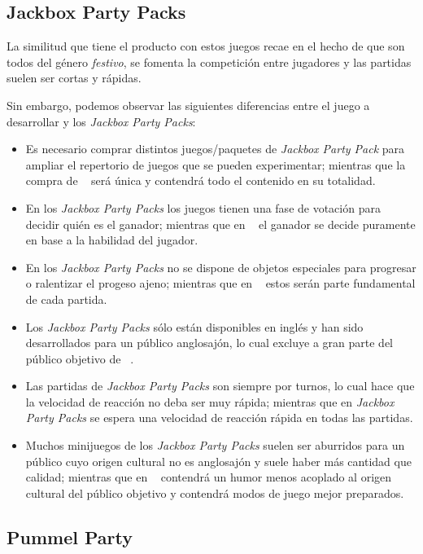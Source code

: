 \subsection{Jackbox Party Packs}

La similitud que tiene el producto con estos juegos recae en el hecho de que son
todos del género \emph{festivo}, se fomenta la competición entre jugadores y las
partidas suelen ser cortas y rápidas.

Sin embargo, podemos observar las siguientes diferencias entre el juego a
desarrollar y los \emph{Jackbox Party Packs}:
\begin{itemize}
    \item Es necesario comprar distintos juegos/paquetes de \emph{Jackbox Party
    Pack} para ampliar el repertorio de juegos que se pueden experimentar;
    mientras que la compra de \emph{\izenburua\ } será única y contendrá todo el
    contenido en su totalidad.
    \item En los \emph{Jackbox Party Packs} los juegos tienen una fase de
    votación para decidir quién es el ganador; mientras que en \emph{\izenburua\
    } el ganador se decide puramente en base a la habilidad del jugador.
    \item En los \emph{Jackbox Party Packs} no se dispone de objetos especiales
    para progresar o ralentizar el progeso ajeno; mientras que en
    \emph{\izenburua\ } estos serán parte fundamental de cada partida.
    \item Los \emph{Jackbox Party Packs} sólo están disponibles en inglés y han
    sido desarrollados para un público anglosajón, lo cual excluye a gran parte
    del público objetivo de \emph{\izenburua\ }.
    \item Las partidas de \emph{Jackbox Party Packs} son siempre por turnos, lo
    cual hace que la velocidad de reacción no deba ser muy rápida; mientras que
    en \emph{Jackbox Party Packs} se espera una velocidad de reacción rápida en
    todas las partidas.
    \item Muchos minijuegos de los \emph{Jackbox Party Packs} suelen ser
    aburridos para un público cuyo origen cultural no es anglosajón y suele
    haber más cantidad que calidad; mientras que en \emph{\izenburua\ }
    contendrá un humor menos acoplado al origen cultural del público objetivo y
    contendrá modos de juego mejor preparados.
\end{itemize}

\subsection{Pummel Party}

